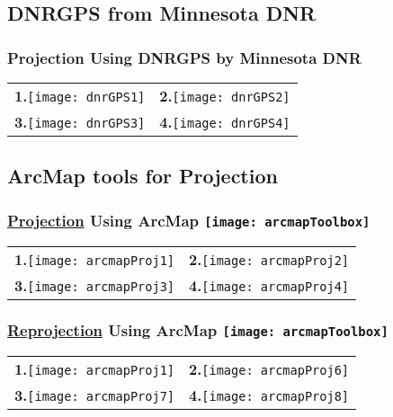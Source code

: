 \documentclass[t]{beamer} %
\begin{document}

\subsection{DNRGPS from Minnesota DNR}
\begin{frame}
\frametitle{Projection Using DNRGPS by Minnesota DNR}
\vspace{-0.2in}
\begin{table}
\begin{tabular}{l l}
\textbf{1.}\texttt{[image: dnrGPS1]} & \textbf{2.}\texttt{[image: dnrGPS2]} \\
\textbf{3.}\texttt{[image: dnrGPS3]} & \textbf{4.}\texttt{[image: dnrGPS4]} \\
\end{tabular}
\end{table}
\end{frame}


\subsection{ArcMap tools for Projection}
\begin{frame}
\frametitle{\underline{Projection} Using ArcMap \hfill \texttt{[image: arcmapToolbox]}}

\vspace{-0.2in}
\begin{table}
\begin{tabular}{l l}
\textbf{1.}\texttt{[image: arcmapProj1]} & \textbf{2.}\texttt{[image: arcmapProj2]} \\
\textbf{3.}\texttt{[image: arcmapProj3]} & \textbf{4.}\texttt{[image: arcmapProj4]} \\
\end{tabular}
\end{table}
\end{frame}


\begin{frame}
\frametitle{\underline{Reprojection} Using ArcMap \hfill \texttt{[image: arcmapToolbox]}}

\vspace{-0.2in}
\begin{table}
\begin{tabular}{l l}
\textbf{1.}\texttt{[image: arcmapProj1]} & \textbf{2.}\texttt{[image: arcmapProj6]} \\
\textbf{3.}\texttt{[image: arcmapProj7]} & \textbf{4.}\texttt{[image: arcmapProj8]} \\
\end{tabular}
\end{table}
\end{frame}
\end{document}
